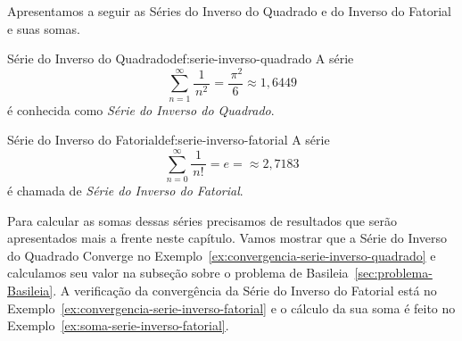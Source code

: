 Apresentamos a seguir as Séries do Inverso do Quadrado e do Inverso do Fatorial
e suas somas.

\begin{definicao}{Série do Inverso do Quadrado}{def:serie-inverso-quadrado}
	A série
  \[
    \sum_{n=1}^\infty \frac{1}{\,n^2\,} = \frac{\,\pi^2}{6} \approx 1,6449
  \]
  é conhecida como \emph{Série do Inverso do Quadrado}.
\end{definicao}

\begin{definicao}{Série do Inverso do Fatorial}{def:serie-inverso-fatorial}
	A série
  \[
   \sum_{n=0}^\infty \frac{1}{\,n!\,} = e = \approx 2,7183
  \]
	é chamada de \emph{Série do Inverso do Fatorial}.
\end{definicao}

Para calcular as somas dessas séries precisamos de resultados que serão
apresentados mais a frente neste capítulo.
Vamos mostrar que a Série do Inverso do Quadrado Converge no
Exemplo~\ref{ex:convergencia-serie-inverso-quadrado}
e calculamos seu valor na subseção sobre o problema de
Basileia~\ref{sec:problema-Basileia}.
A verificação da convergência da Série do Inverso do Fatorial
está no Exemplo~\ref{ex:convergencia-serie-inverso-fatorial}
e o cálculo da sua soma é feito no
Exemplo~\ref{ex:soma-serie-inverso-fatorial}.

